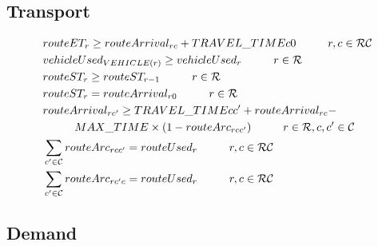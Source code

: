 \subsection{Transport}

\begin{align}
		& routeET_{r} \ge routeArrival_{rc} + TRAVEL\_TIME{c0}
				\hspace{10mm} r, c \in \mathcal{RC}\\
		& vehicleUsed_{VEHICLE(r)} \ge vehicleUsed_{r}
				\hspace{10mm} r \in \mathcal{R}\\
		& routeST_{r} \ge routeST_{r-1}
				\hspace{10mm} r \in \mathcal{R}\\
		& routeST_{r} = routeArrival_{r0}
				\hspace{10mm} r \in \mathcal{R}\\
		& routeArrival_{rc'} \ge TRAVEL\_TIME{cc'} + routeArrival_{rc} - \notag\\ 
		& \hspace{10mm} MAX\_TIME \times (1 - routeArc_{rcc'})
				\hspace{10mm} r \in \mathcal{R}, c, c' \in \mathcal{C} \\
		& \sum_{c' \in \mathcal{C}} routeArc_{rcc'}  = routeUsed_{r}
				\hspace{10mm} r, c \in \mathcal{RC} \\
		& \sum_{c' \in \mathcal{C}} routeArc_{rc'c}  = routeUsed_{r}
				\hspace{10mm} r, c \in \mathcal{RC} \\				
\end{align}

\subsection{Demand}

